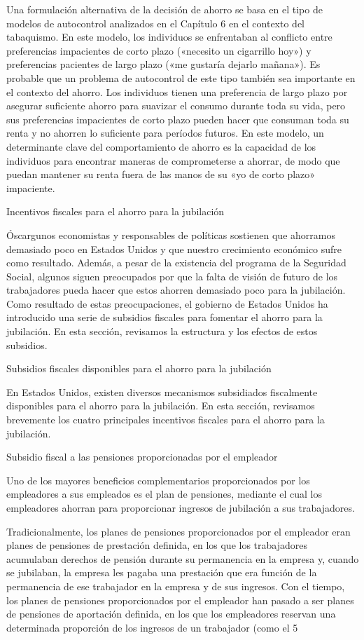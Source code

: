 \documentclass[10pt,a4paper]{article}
\begin{document}
Una formulación alternativa de la decisión de ahorro se basa en el tipo de modelos de autocontrol analizados en el Capítulo 6 en el contexto del tabaquismo. En este modelo, los individuos se enfrentaban al conflicto entre preferencias impacientes de corto plazo («necesito un cigarrillo hoy») y preferencias pacientes de largo plazo («me gustaría dejarlo mañana»). Es probable que un problema de autocontrol de este tipo también sea importante en el contexto del ahorro. Los individuos tienen una preferencia de largo plazo por asegurar suficiente ahorro para suavizar el consumo durante toda su vida, pero sus preferencias impacientes de corto plazo pueden hacer que consuman toda su renta y no ahorren lo suficiente para períodos futuros. En este modelo, un determinante clave del comportamiento de ahorro es la capacidad de los individuos para encontrar maneras de comprometerse a ahorrar, de modo que puedan mantener su renta fuera de las manos de su «yo de corto plazo» impaciente.


Incentivos fiscales para el ahorro para la jubilación

Óscargunos economistas y responsables de políticas sostienen que ahorramos demasiado poco en Estados Unidos y que nuestro crecimiento económico sufre como resultado. Además, a pesar de la existencia del programa de la Seguridad Social, algunos siguen preocupados por que la falta de visión de futuro de los trabajadores pueda hacer que estos ahorren demasiado poco para la jubilación. Como resultado de estas preocupaciones, el gobierno de Estados Unidos ha introducido una serie de subsidios fiscales para fomentar el ahorro para la jubilación. En esta sección, revisamos la estructura y los efectos de estos subsidios.

Subsidios fiscales disponibles para el ahorro para la jubilación

En Estados Unidos, existen diversos mecanismos subsidiados fiscalmente disponibles para el ahorro para la jubilación. En esta sección, revisamos brevemente los cuatro principales incentivos fiscales para el ahorro para la jubilación.

Subsidio fiscal a las pensiones proporcionadas por el empleador

Uno de los mayores beneficios complementarios proporcionados por los empleadores a sus empleados es el plan de pensiones, mediante el cual los empleadores ahorran para proporcionar ingresos de jubilación a sus trabajadores.

Tradicionalmente, los planes de pensiones proporcionados por el empleador eran planes de pensiones de prestación definida, en los que los trabajadores acumulaban derechos de pensión durante su permanencia en la empresa y, cuando se jubilaban, la empresa les pagaba una prestación que era función de la permanencia de ese trabajador en la empresa y de sus ingresos. Con el tiempo, los planes de pensiones proporcionados por el empleador han pasado a ser planes de pensiones de aportación definida, en los que los empleadores reservan una determinada proporción de los ingresos de un trabajador (como el 5 %
\end{document}
